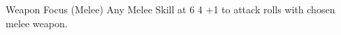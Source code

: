 \CreatePerk
  {Weapon Focus (Melee)} %
  {Any Melee Skill at 6} %
  {4} %
  {+1 to attack rolls with chosen melee weapon.} %